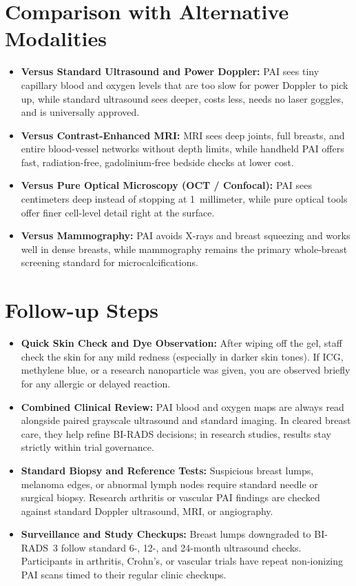 \section{Comparison with Alternative Modalities}
\begin{itemize}
  \item \textbf{Versus Standard Ultrasound and Power Doppler:} PAI sees tiny capillary blood and oxygen levels that are too slow for power Doppler to pick up, while standard ultrasound sees deeper, costs less, needs no laser goggles, and is universally approved.
  \item \textbf{Versus Contrast-Enhanced MRI:} MRI sees deep joints, full breasts, and entire blood-vessel networks without depth limits, while handheld PAI offers fast, radiation-free, gadolinium-free bedside checks at lower cost.
  \item \textbf{Versus Pure Optical Microscopy (OCT / Confocal):} PAI sees centimeters deep instead of stopping at 1~millimeter, while pure optical tools offer finer cell-level detail right at the surface.
  \item \textbf{Versus Mammography:} PAI avoids X-rays and breast squeezing and works well in dense breasts, while mammography remains the primary whole-breast screening standard for microcalcifications.
\end{itemize}

\section{Follow-up Steps}
\begin{itemize}
  \item \textbf{Quick Skin Check and Dye Observation:} After wiping off the gel, staff check the skin for any mild redness (especially in darker skin tones). If ICG, methylene blue, or a research nanoparticle was given, you are observed briefly for any allergic or delayed reaction.
  \item \textbf{Combined Clinical Review:} PAI blood and oxygen maps are always read alongside paired grayscale ultrasound and standard imaging. In cleared breast care, they help refine BI-RADS decisions; in research studies, results stay strictly within trial governance.
  \item \textbf{Standard Biopsy and Reference Tests:} Suspicious breast lumps, melanoma edges, or abnormal lymph nodes require standard needle or surgical biopsy. Research arthritis or vascular PAI findings are checked against standard Doppler ultrasound, MRI, or angiography.
  \item \textbf{Surveillance and Study Checkups:} Breast lumps downgraded to BI-RADS~3 follow standard 6-, 12-, and 24-month ultrasound checks. Participants in arthritis, Crohn's, or vascular trials have repeat non-ionizing PAI scans timed to their regular clinic checkups.
\end{itemize}

